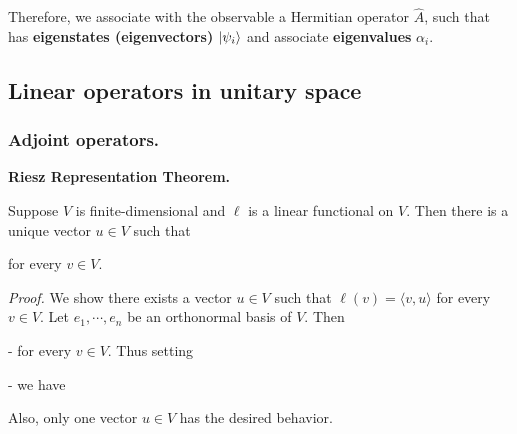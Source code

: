 \documentclass{article}
\begin{document}
Therefore, we associate with the observable a Hermitian operator $\hat{A}$, such that has \textbf{eigenstates (eigenvectors)} $\ket{\psi_i}$ and associate \textbf{eigenvalues} $\alpha_{i}$.




\subsection{Linear operators in unitary space}


\subsubsection{Adjoint operators.}




\skl

\textbf{Riesz Representation Theorem.}


Suppose $V$ is finite-dimensional and $\ell$ is a linear functional on $V$. Then there is a unique vector $u \in V$ such that


for every $v \in V$.

\textit{Proof.} We show there exists a vector $u \in V$ such that
$\ell (v) =  \langle v,u \rangle$ for every $v \in V$. Let $e_1, \cdots , e_n$ be an orthonormal basis of $V$. Then


- for every $v \in V$. Thus setting


- we have


Also, only one vector $u \in V$ has the desired behavior.


\skl


\end{document}
